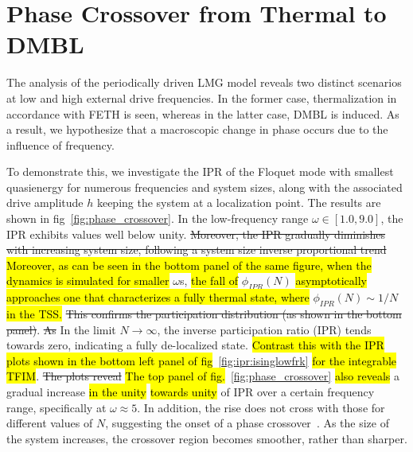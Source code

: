 \documentclass[%
reprint,
superscriptaddress,
linenumbers,
amsmath,amssymb,
aps,
prb,
showkeys,
]{revtex4-2}
\begin{document}
	\section{\label{sec:level5}Phase Crossover from Thermal to DMBL}
	The analysis of the periodically driven LMG model reveals two distinct scenarios at low and high external drive frequencies. In the former case, thermalization in accordance with FETH is seen, whereas in the latter case, DMBL is induced. As a result, we hypothesize that a macroscopic change in phase occurs due to the influence of frequency. 
	
	To demonstrate this, we investigate the IPR of the  Floquet mode with smallest quasienergy
	for numerous frequencies and system sizes, along with the associated drive amplitude $h$ keeping the system at a localization point. The results are shown in fig~\ref{fig:phase_crossover}. In the low-frequency range $\omega \in \left[1.0, 9.0\right]$, the IPR exhibits values well below unity.  \st{Moreover, the IPR gradually diminishes with increasing system size, following a system size inverse proportional trend} \hl{Moreover, as can be seen in the bottom panel of the same figure, when the dynamics is simulated for smaller} $\omega$s, \hl{the fall of} $\phi_{IPR}(N)$ \hl{asymptotically approaches one that characterizes a fully thermal state, where} $\phi_{IPR}(N)\sim 1/N$ \hl{in the TSS. }  \st{This confirms the participation distribution (as shown in the bottom panel)}. \st{As} In the limit  $N\rightarrow\infty$, the inverse participation ratio (IPR) tends towards zero, indicating a fully de-localized state.  \hl{Contrast this with the IPR plots shown in the bottom left panel of fig}~\ref{fig:ipr:isinglowfrk} \hl{for the integrable TFIM}. \st{The plots reveal} \hl{The top panel of fig.}~\ref{fig:phase_crossover} \hl{also reveals} a gradual increase \hl{in the unity} \hl{towards unity} of IPR over a certain frequency range, specifically at $\omega \approx 5$. In addition, the rise does not cross with those for different values of $N$, suggesting the onset of a phase crossover~\cite{sierant_2023, sachdev_quantum_2011}. As the size of the system increases, the crossover region becomes smoother, rather than sharper.
\end{document}
